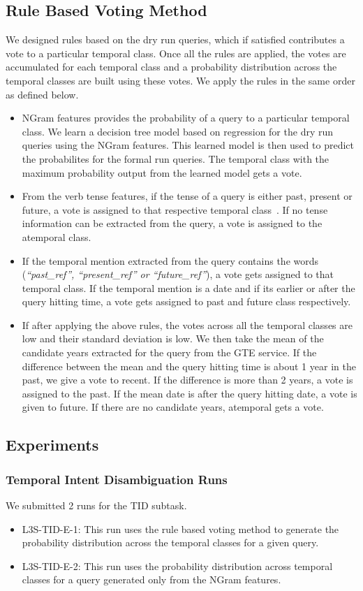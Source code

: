 \documentclass{sig-alternate}
\begin{document}
\subsection{Rule Based Voting Method}\label{sec:tid rules}
We designed rules based on the dry run queries, which if satisfied contributes a vote to a particular temporal class. Once all the rules are applied, the votes are accumulated for each temporal class and a probability distribution across the temporal classes are built using these votes. We apply the rules in the same order as defined below.
\begin{itemize}
\item \textsf{NGram features} provides the probability of a query to a particular temporal class. We learn a decision tree model based on regression for the dry run queries using the NGram features. This learned model is then used to predict the probabilites for the formal run queries. The temporal class with the maximum probability output from the learned model gets a vote.
\item From the \textsf{verb tense features}, if the tense of a query is either past, present or future, a vote is assigned to that respective temporal class~\cite{hitsz}. If no tense information can be extracted from the query, a vote is assigned to the atemporal class.
\item If the \textsf{temporal mention} extracted from the query contains the words (\textit{``past\_ref'', ``present\_ref'' or ``future\_ref''}), a vote gets assigned to that temporal class. If the temporal mention is a date and if its earlier or after the query hitting time, a vote gets assigned to past and future class respectively.
\item If after applying the above rules, the votes across all the temporal classes are low and their standard deviation is low. We then take the mean of the candidate years extracted for the query from the \textsf{GTE service}. If the difference between the mean and the query hitting time is about 1 year in the past, we give a vote to recent. If the difference is more than 2 years, a vote is assigned to the past. If the mean date is after the query hitting date, a vote is given to future. If there are no candidate years, atemporal gets a vote.
\end{itemize}
\subsection{Experiments}
\subsubsection{Temporal Intent Disambiguation Runs}
We submitted 2 runs for the TID subtask.
\begin{itemize}
\item \textsf{L3S-TID-E-1}: This run uses the \textsf{rule based voting method} to generate the probability distribution across the temporal classes for a given query.
\item \textsf{L3S-TID-E-2}: This run uses the probability distribution across temporal classes for a query generated only from the \textsf{NGram features}.
\end{itemize}
\end{document}
